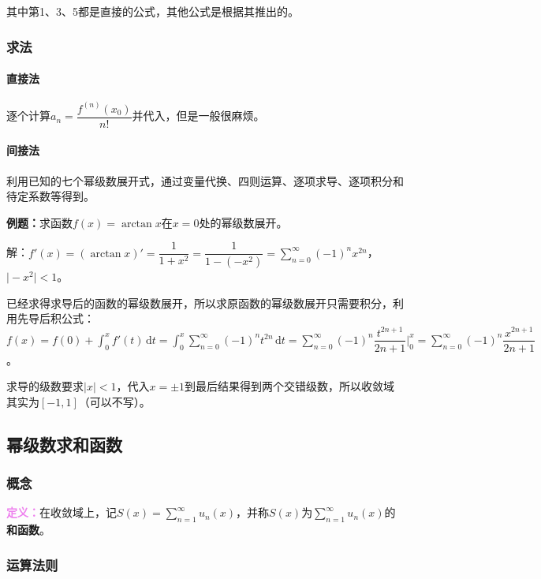 \documentclass[UTF8, 12pt]{ctexart}
\begin{document}
其中第1、3、5都是直接的公式，其他公式是根据其推出的。

\subsubsection{求法}

\paragraph{直接法} \leavevmode \medskip

逐个计算$a_n=\dfrac{f^{(n)}(x_0)}{n!}$并代入，但是一般很麻烦。

\paragraph{间接法} \leavevmode \medskip

利用已知的七个幂级数展开式，通过变量代换、四则运算、逐项求导、逐项积分和待定系数等得到。

\textbf{例题：}求函数$f(x)=\arctan x$在$x=0$处的幂级数展开。

解：$f'(x)=(\arctan x)'=\dfrac{1}{1+x^2}=\dfrac{1}{1-(-x^2)}=\sum\limits_{n=0}^\infty(-1)^nx^{2n}$，$\vert-x^2\vert<1$。

已经求得求导后的函数的幂级数展开，所以求原函数的幂级数展开只需要积分，利用先导后积公式：$f(x)=f(0)+\int_0^xf'(t)\,\textrm{d}t=\int_0^x\sum\limits_{n=0}^\infty(-1)^nt^{2n}\,\textrm{d}t=\sum\limits_{n=0}^\infty(-1)^n\dfrac{t^{2n+1}}{2n+1}\bigg|_0^x=\sum\limits_{n=0}^\infty(-1)^n\dfrac{x^{2n+1}}{2n+1}$。

求导的级数要求$\vert x\vert<1$，代入$x=\pm1$到最后结果得到两个交错级数，所以收敛域其实为$[-1,1]$（可以不写）。

\subsection{幂级数求和函数}

\subsubsection{概念}

\textcolor{violet}{\textbf{定义：}}在收敛域上，记$S(x)=\sum\limits_{n=1}^\infty u_n(x)$，并称$S(x)$为$\sum\limits_{n=1}^\infty u_n(x)$的\textbf{和函数}。

\subsubsection{运算法则}
\end{document}
